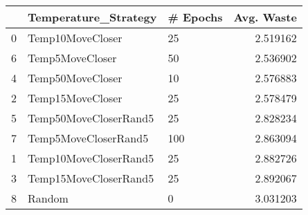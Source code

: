 \begin{tabular}{lllr}
\toprule
{} &   Temperature\_Strategy & \# Epochs &  Avg. Waste \\
\midrule
0 &       Temp10MoveCloser &       25 &    2.519162 \\
6 &        Temp5MoveCloser &       50 &    2.536902 \\
4 &       Temp50MoveCloser &       10 &    2.576883 \\
2 &       Temp15MoveCloser &       25 &    2.578479 \\
5 &  Temp50MoveCloserRand5 &       25 &    2.828234 \\
7 &   Temp5MoveCloserRand5 &      100 &    2.863094 \\
1 &  Temp10MoveCloserRand5 &       25 &    2.882726 \\
3 &  Temp15MoveCloserRand5 &       25 &    2.892067 \\
8 &                 Random &        0 &    3.031203 \\
\bottomrule
\end{tabular}

